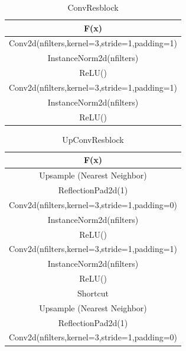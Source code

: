 \begin{table}[ht]
\caption{ConvResblock} %
\centering %
\begin{tabular}{c} %
\hline\hline %
F(x)\\%
\hline
Conv2d(nfilters,kernel=3,stride=1,padding=1) \\
InstanceNorm2d(nfilters)\\ %
ReLU() \\
Conv2d(nfilters,kernel=3,stride=1,padding=1) \\
InstanceNorm2d(nfilters)\\ %
ReLU() \\
\hline %
\end{tabular}
\label{table:convresblock} %
\end{table}


\begin{table}[ht]
\caption{UpConvResblock} %
\centering %
\begin{tabular}{c} %
\hline\hline %
F(x)\\%
\hline
Upsample (Nearest Neighbor) \\
ReflectionPad2d(1) \\
Conv2d(nfilters,kernel=3,stride=1,padding=0) \\
InstanceNorm2d(nfilters)\\ %
ReLU() \\
Conv2d(nfilters,kernel=3,stride=1,padding=1) \\
InstanceNorm2d(nfilters)\\ %
ReLU() \\
\hline %
Shortcut\\
\hline 
Upsample (Nearest Neighbor) \\
ReflectionPad2d(1)\\
Conv2d(nfilters,kernel=3,stride=1,padding=0) \\
\hline
\end{tabular}
\label{table:upconvresblock} %
\end{table}

